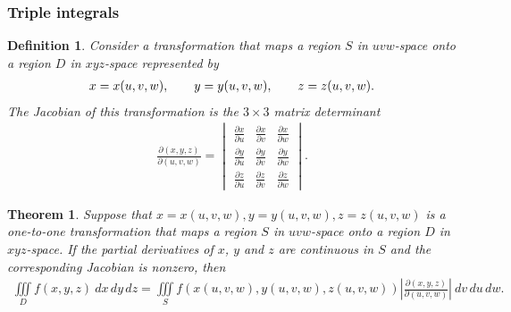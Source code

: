\documentclass{article}
\theoremstyle{sltheorem}
\newtheorem{definition}{Definition}[section]
\newtheorem{theorem}{Theorem}[section]
\newcommand{\ti}{\iiint\limits}
\newcommand{\hs}{\hspace{0.7cm}}
\begin{document}
\subsubsection{Triple integrals}
\begin{definition}
    Consider a transformation that maps a region $S$ in $uvw$-space onto a region $D$ in
    $xyz$-space represented by
    \begin{align*}
        x=x(u,v,w),\hs y=y(u,v,w),\hs z=z(u,v,w).
    \end{align*}
    The Jacobian of this transformation is the $3\times3$ matrix determinant
    \begin{align*}
        \frac{\partial(x,y,z)}{\partial(u,v,w)}=\begin{vmatrix}
            \frac{\partial x}{\partial u}&\frac{\partial x}{\partial v}&\frac{\partial x}{\partial w}\\
            \frac{\partial y}{\partial u}&\frac{\partial y}{\partial v}&\frac{\partial y}{\partial w}\\
            \frac{\partial z}{\partial u}&\frac{\partial z}{\partial v}&\frac{\partial z}{\partial w}
        \end{vmatrix}.
    \end{align*}
\end{definition}
\begin{theorem}
    Suppose that $x=x(u,v,w),y=y(u,v,w),z=z(u,v,w)$ is a one-to-one transformation that maps a
    region $S$ in $uvw$-space onto a region $D$ in $xyz$-space. If the partial derivatives of
    $x$, $y$ and $z$ are continuous in $S$ and the corresponding Jacobian is nonzero,
    then
    \begin{align*}
       \ti_D f(x,y,z)\:dx\,dy\,dz = \ti_S f(x(u,v,w), y(u,v,w), z(u,v,w))\left|\frac{\partial(x,y,z)}{\partial(u,v,w)}\right|\:dv\,du\,dw. 
    \end{align*}
\end{theorem}
\end{document}

